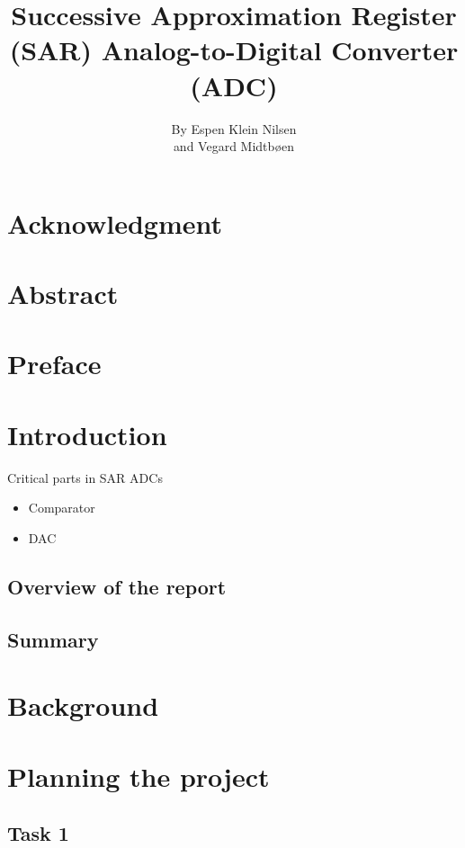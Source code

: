 \documentclass[english, 12pt, a4paper]{ifimaster}
\title{ \huge{Successive Approximation Register (SAR) Analog-to-Digital Converter (ADC)}}
\author{By Espen Klein Nilsen\\ and Vegard Midtbøen}
\begin{document}
\ififorside{}
\frontmatter{}
\maketitle{}
\chapter*{Acknowledgment}

\chapter*{Abstract}

\tableofcontents{}
\listoffigures{}
\listoftables{}

\chapter*{Preface}


\mainmatter{}        

\chapter{Introduction}         
Critical parts in SAR ADCs 
\begin{itemize}
 \item Comparator
 \item DAC
\end{itemize}


\section{Overview of the report}

\section{Summary}

\chapter{Background}


\chapter{Planning the project} 
\section{Task 1}
\end{document}
